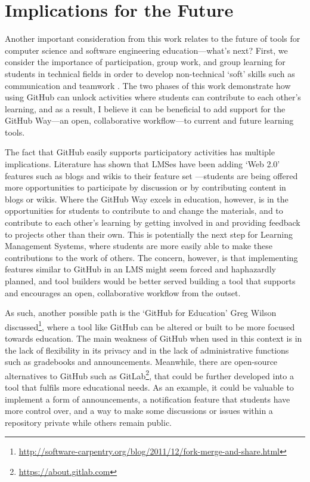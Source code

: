 \section{Implications for the Future}
Another important consideration from this work relates to the future of tools for computer science and software engineering education---what's next? First, we consider the importance of participation, group work, and group learning for students in technical fields in order to develop non-technical `soft' skills such as communication and teamwork \cite{jazayeri2004education}. The two phases of this work demonstrate how using GitHub can unlock activities where students can contribute to each other's learning, and as a result, I believe it can be beneficial to add support for the GitHub Way---an open, collaborative workflow---to current and future learning tools.

The fact that GitHub easily supports participatory activities has multiple implications. Literature has shown that LMSes have been adding `Web 2.0' features such as blogs and wikis to their feature set \cite{downes2005feature}---students are being offered more opportunities to participate by discussion or by contributing content in blogs or wikis. Where the GitHub Way excels in education, however, is in the opportunities for students to contribute to and change the materials, and to contribute to each other's learning by getting involved in and providing feedback to projects other than their own. This is potentially the next step for Learning Management Systems, where students are more easily able to make these contributions to the work of others. The concern, however, is that implementing features similar to GitHub in an LMS might seem forced and haphazardly planned, and tool builders would be better served building a tool that supports and encourages an open, collaborative workflow from the outset.

As such, another possible path is the `GitHub for Education' Greg Wilson discussed\footnote{\url{http://software-carpentry.org/blog/2011/12/fork-merge-and-share.html}}, where a tool like GitHub can be altered or built to be more focused towards education. The main weakness of GitHub when used in this context is in the lack of flexibility in its privacy and in the lack of administrative functions such as gradebooks and announcements. Meanwhile, there are open-source alternatives to GitHub such as GitLab\footnote{\url{https://about.gitlab.com}}, that could be further developed into a tool that fulfils more educational needs. As an example, it could be valuable to implement a form of announcements, a notification feature that students have more control over, and a way to make some discussions or issues within a repository private while others remain public.

